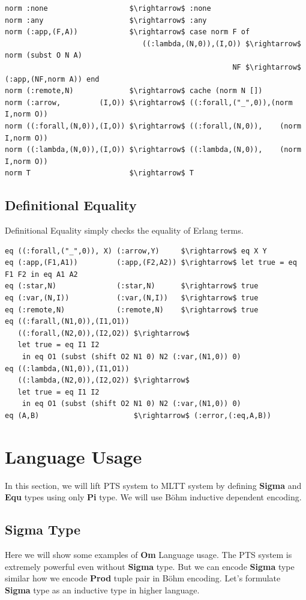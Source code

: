 \documentclass{aip-cp}
\begin{document}
\begin{lstlisting}[mathescape=true]
norm :none                   $\rightarrow$ :none
norm :any                    $\rightarrow$ :any
norm (:app,(F,A))            $\rightarrow$ case norm F of
                                ((:lambda,(N,0)),(I,O)) $\rightarrow$ norm (subst O N A)
                                                     NF $\rightarrow$ (:app,(NF,norm A)) end
norm (:remote,N)             $\rightarrow$ cache (norm N [])
norm (:arrow,         (I,O)) $\rightarrow$ ((:forall,("_",0)),(norm I,norm O))
norm ((:forall,(N,0)),(I,O)) $\rightarrow$ ((:forall,(N,0)),    (norm I,norm O))
norm ((:lambda,(N,0)),(I,O)) $\rightarrow$ ((:lambda,(N,0)),    (norm I,norm O))
norm T                       $\rightarrow$ T
\end{lstlisting}

\subsection{Definitional Equality}
Definitional Equality simply checks the equality of Erlang terms.

\begin{lstlisting}[mathescape=true]
eq ((:forall,("_",0)), X) (:arrow,Y)     $\rightarrow$ eq X Y
eq (:app,(F1,A1))         (:app,(F2,A2)) $\rightarrow$ let true = eq F1 F2 in eq A1 A2
eq (:star,N)              (:star,N)      $\rightarrow$ true
eq (:var,(N,I))           (:var,(N,I))   $\rightarrow$ true
eq (:remote,N)            (:remote,N)    $\rightarrow$ true
eq ((:farall,(N1,0)),(I1,O1))
   ((:forall,(N2,0)),(I2,O2)) $\rightarrow$
   let true = eq I1 I2
    in eq O1 (subst (shift O2 N1 0) N2 (:var,(N1,0)) 0)
eq ((:lambda,(N1,0)),(I1,O1))
   ((:lambda,(N2,0)),(I2,O2)) $\rightarrow$
   let true = eq I1 I2
    in eq O1 (subst (shift O2 N1 0) N2 (:var,(N1,0)) 0)
eq (A,B)                      $\rightarrow$ (:error,(:eq,A,B))
\end{lstlisting}

\section{Language Usage}
In this section, we will lift PTS system to MLTT system by defining
{\bf Sigma} and {\bf Equ} types using only {\bf Pi} type. We will use Böhm inductive
dependent encoding\cite{Bohm85}.

\subsection{Sigma Type}
Here we will show some examples of {\bf Om} Language usage.
The PTS system is extremely powerful even without {\bf Sigma} type.
But we can encode {\bf Sigma} type similar how we encode {\bf Prod}
tuple pair in Böhm encoding. Let's formulate {\bf Sigma} type as an
inductive type in higher language.
\end{document}
